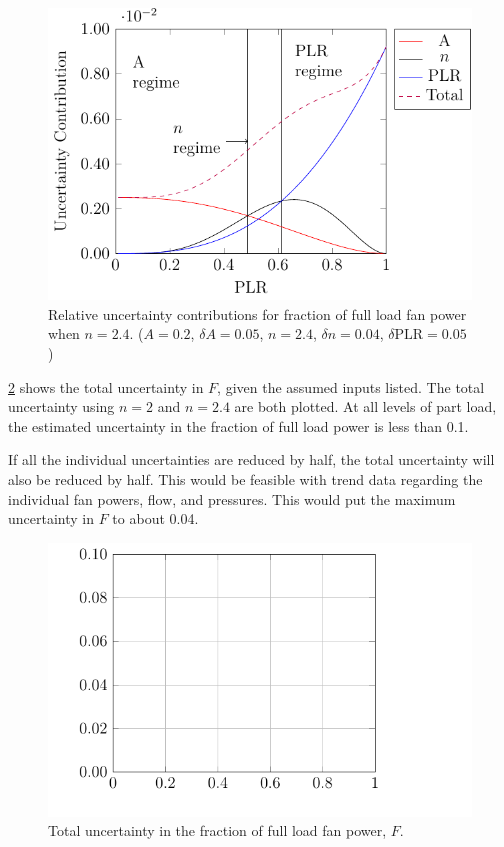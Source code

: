 \begin{figure}
\centering
\includegraphics{Plots/2017-06-05-FFLPUncN24.pdf}
\caption{Relative uncertainty contributions for fraction of full load
fan power when \(n=2.4\). (\(A=0.2\), \(\delta A = 0.05\), \(n=2.4\),
\(\delta n =0.04\), \(\delta \text{PLR}=0.05\))}
\label{fig:FFLRUncertaintyN24}
\end{figure}



\figref{} \ref{fig:TotalFFLRUncertainty} shows the total uncertainty in
\(F\), given the assumed inputs listed. The total uncertainty using
\(n=2\) and \(n=2.4\) are both plotted. At all levels of part load, the
estimated uncertainty in the fraction of full load power is less than
0.1.

If all the individual uncertainties are reduced by half, the total
uncertainty will also be reduced by half. This would be feasible with
trend data regarding the individual fan powers, flow, and pressures.
This would put the maximum uncertainty in \(F\) to about 0.04.

\begin{figure}
\centering
\includegraphics{Plots/2017-05-15-totalFFLPUncertainty.pdf}
\caption{Total uncertainty in the fraction of full load fan power, \(F\).}
\label{fig:TotalFFLRUncertainty}
\end{figure}



